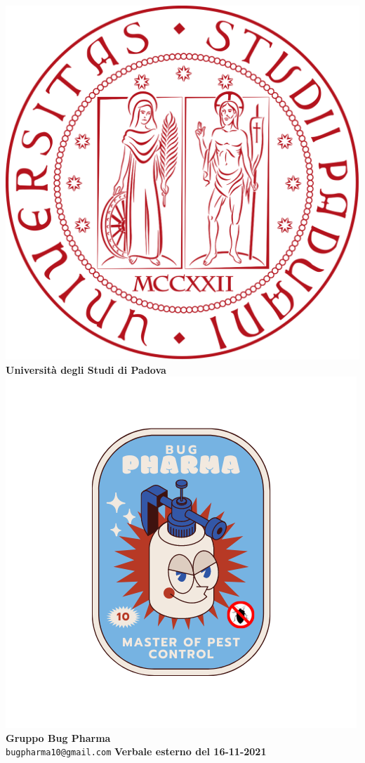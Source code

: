 \documentclass[11pt]{article}
\begin{document}
	\thispagestyle{empty}
	\begin{titlepage}
		\begin{center}
			\includegraphics[scale = 0.05]{../../Res/logo_unipd.png}\\
			\bigskip
			\large \textbf{Università degli Studi di Padova} \\
			\vfill
			\includegraphics[scale = 0.7]{../../Res/BugPharma_Logo.png}\\
			\huge \textbf{Gruppo Bug Pharma} \\
			\vfill
			\large \texttt{bugpharma10@gmail.com}
			\vfill
			\Huge \textbf{Verbale esterno del 16-11-2021}\\
			

\end{center}
\end{titlepage}
\end{document}
